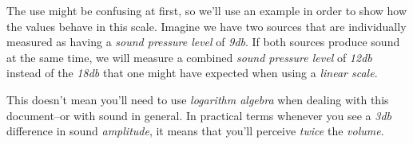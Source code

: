\documentclass[10pt,a4paper]{report}
\begin{document}
\begin{center}
\end{center}

The use might be confusing at first, so we'll use an example in order to show how the values behave in this scale. Imagine we have two sources that are individually measured as having a \textit{sound pressure level} of \textit{9\acrshort{db}}. If both sources produce sound at the same time, we will measure a combined \textit{sound pressure level} of \textit{12\acrshort{db}} instead of the \textit{18\acrshort{db}} that one might have expected when using a \textit{linear scale}. 

This doesn't mean you'll need to use \textit{logarithm algebra} when dealing with this document--or with sound in general. In practical terms whenever you see a \textit{3\acrshort{db}} difference in sound \textit{amplitude}, it means that you'll perceive \textit{twice} the \textit{volume}.
\end{document}
